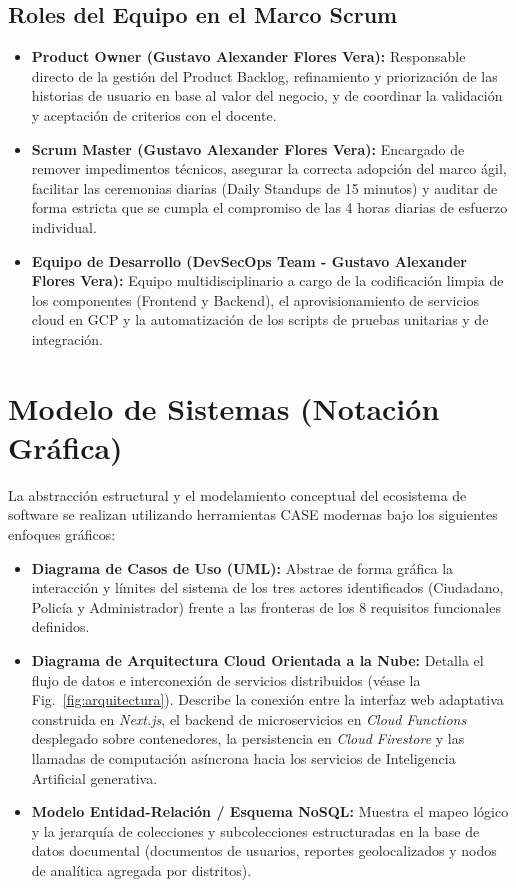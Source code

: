 \documentclass[conference]{IEEEtran}
\begin{document}
\subsection{Roles del Equipo en el Marco Scrum}
\begin{itemize}
    \item \textbf{Product Owner (Gustavo Alexander Flores Vera):} Responsable directo de la gestión del Product Backlog, refinamiento y priorización de las historias de usuario en base al valor del negocio, y de coordinar la validación y aceptación de criterios con el docente.
    \item \textbf{Scrum Master (Gustavo Alexander Flores Vera):} Encargado de remover impedimentos técnicos, asegurar la correcta adopción del marco ágil, facilitar las ceremonias diarias (Daily Standups de 15 minutos) y auditar de forma estricta que se cumpla el compromiso de las 4 horas diarias de esfuerzo individual.
    \item \textbf{Equipo de Desarrollo (DevSecOps Team - Gustavo Alexander Flores Vera):} Equipo multidisciplinario a cargo de la codificación limpia de los componentes (Frontend y Backend), el aprovisionamiento de servicios cloud en GCP y la automatización de los scripts de pruebas unitarias y de integración.
\end{itemize}

\section{Modelo de Sistemas (Notación Gráfica)}
La abstracción estructural y el modelamiento conceptual del ecosistema de software se realizan utilizando herramientas CASE modernas bajo los siguientes enfoques gráficos:
\begin{itemize}
    \item \textbf{Diagrama de Casos de Uso (UML):} Abstrae de forma gráfica la interacción y límites del sistema de los tres actores identificados (Ciudadano, Policía y Administrador) frente a las fronteras de los 8 requisitos funcionales definidos.
    \item \textbf{Diagrama de Arquitectura Cloud Orientada a la Nube:} Detalla el flujo de datos e interconexión de servicios distribuidos (véase la Fig.~\ref{fig:arquitectura}). Describe la conexión entre la interfaz web adaptativa construida en \textit{Next.js}, el backend de microservicios en \textit{Cloud Functions} desplegado sobre contenedores, la persistencia en \textit{Cloud Firestore} y las llamadas de computación asíncrona hacia los servicios de Inteligencia Artificial generativa.
    \item \textbf{Modelo Entidad-Relación / Esquema NoSQL:} Muestra el mapeo lógico y la jerarquía de colecciones y subcolecciones estructuradas en la base de datos documental (documentos de usuarios, reportes geolocalizados y nodos de analítica agregada por distritos).
\end{itemize}
\end{document}
